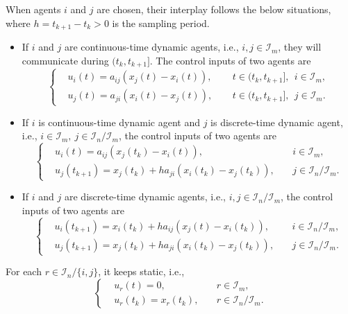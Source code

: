 \documentclass[12pt,draftcls,onecolumn]{IEEEtran}
\begin{document}
When agents $i$ and $j$ are chosen, their interplay follows the below situations, where $h=t_{k+1}-t_{k}>0$ is the sampling period.
\begin{itemize}
  \item If $i$ and $j$ are continuous-time dynamic agents, i.e., $i,j \in \mathcal{I}_m$, they will communicate during $(t_k,t_{k+1}]$. The control inputs of two agents are
      \begin{equation}\label{gossip-CC}
      \left\{
      \begin{aligned}
         &u_i(t)=a_{ij}(x_j(t)-x_i(t)),~~&&t\in(t_k,t_{k+1}],~~i\in \mathcal{I}_m,\\
         &u_j(t)=a_{ji}(x_i(t)-x_j(t)),~~&&t\in(t_k,t_{k+1}],~~j\in \mathcal{I}_m.
      \end{aligned}
      \right.
      \end{equation}
  \item If $i$ is continuous-time dynamic agent and $j$ is discrete-time dynamic agent, i.e., $i\in \mathcal{I}_m,~j\in \mathcal{I}_{n}/\mathcal{I}_{m}$, the control inputs of two agents are
      \begin{equation}\label{gossip-CD}
        \left\{
       \begin{aligned}
      &u_i(t)=a_{ij}(x_j(t_{k})-x_i(t)),~&&i\in \mathcal{I}_m,\\
      &u_j(t_{k+1})=x_j(t_k)+ha_{ji}(x_i(t_k)-x_j(t_k)),~&&j\in \mathcal{I}_{n}/\mathcal{I}_{m}.
     \end{aligned}
      \right.
      \end{equation}
  \item If $i$ and $j$ are discrete-time dynamic agents, i.e., $i,j \in \mathcal{I}_{n}/\mathcal{I}_{m}$, the control inputs of two agents are
      \begin{equation}\label{gossip-DD}
        \left\{
      \begin{aligned}
        &u_i(t_{k+1})=x_i(t_k)+ha_{ij}(x_j(t)-x_i(t_k)),~&&i\in \mathcal{I}_{n}/\mathcal{I}_{m},\\
        &u_j(t_{k+1})=x_j(t_k)+ha_{ji}(x_i(t_k)-x_j(t_k)),~&&j\in \mathcal{I}_{n}/\mathcal{I}_{m}.
      \end{aligned}
        \right.
      \end{equation}
\end{itemize}
For each $r\in\mathcal{I}_n/\{i,j\}$, it keeps static, i.e.,
\begin{equation}\label{gossip-lf}
\left\{
\begin{aligned}
&u_r(t)=0,~&&r\in\mathcal{I}_m,\\
&u_r(t_{k})=x_r(t_k),~&&r\in \mathcal{I}_{n}/\mathcal{I}_{m}.
\end{aligned}
\right.
\end{equation}
\end{document}
